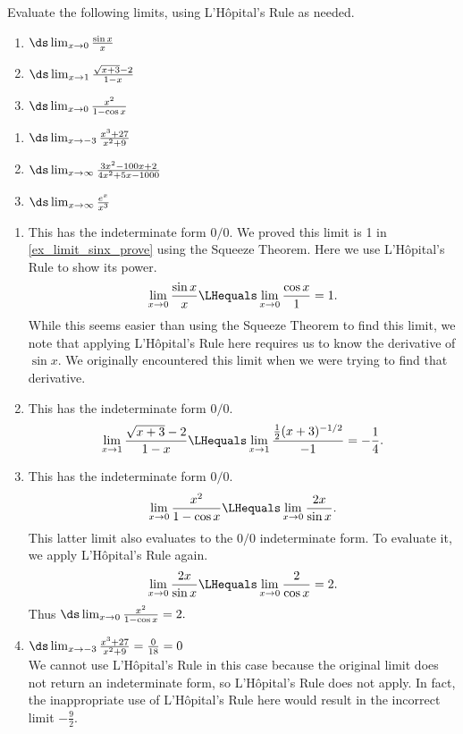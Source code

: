 \begin{example}\label{ex_lhr1}%
Evaluate the following limits, using L'Hôpital's Rule as needed.\\
\begin{minipage}[t]{.5\textwidth}
\begin{enumerate}
\item		$\ds \lim_{x\to0}\frac{\sin x}x$
\item		$\ds \lim_{x\to 1}\frac{\sqrt{x+3}-2}{1-x}$
\item		$\ds \lim_{x\to0}\frac{x^2}{1-\cos x}$
\end{enumerate}
\end{minipage}%
\begin{minipage}[t]{.5\textwidth}
\begin{enumerate}\addtocounter{enumi}{3}
	\item	$\ds\lim_{x\to-3}\frac{x^3+27}{x^2+9}$
	\item	$\ds\lim_{x\to\infty}\frac{3x^2-100x+2}{4x^2+5x-1000}$
	\item	$\ds\lim_{x\to\infty}\frac{e^x}{x^3}$
\end{enumerate}
\end{minipage}
\solution
\begin{enumerate}
	\item	This has the indeterminate form $0/0$. We proved this limit is 1 in \autoref{ex_limit_sinx_prove} using the Squeeze Theorem. Here we use L'Hôpital's Rule to show its power.
\[\lim_{x\to0}\frac{\sin x}x \LHequals \lim_{x\to0} \frac{\cos x}{1}=1.\]
While this seems easier than using the Squeeze Theorem to find this limit, we note that applying L'Hôpital's Rule here requires us to know the derivative of $\sin x$. We originally encountered this limit when we were trying to find that derivative.

	\item	This has the indeterminate form $0/0$.
\[\lim_{x\to 1}\frac{\sqrt{x+3}-2}{1-x} 	 \LHequals \lim_{x \to 1} \frac{\frac12(x+3)^{-1/2}}{-1} =-\frac 14.\]

	\item	This has the indeterminate form $0/0$.
\[\lim_{x\to 0}\frac{x^2}{1-\cos x}  \LHequals  \lim_{x\to 0} \frac{2x}{\sin x}.\]
This latter limit also evaluates to the $0/0$ indeterminate form. To evaluate it, we apply L'Hôpital's Rule again.
\[
 \lim_{x\to 0} \frac{2x}{\sin x}
 \LHequals \lim_{x\to 0} \frac{2}{\cos x} = 2 .
\]
Thus $\ds \lim_{x\to0}\frac{x^2}{1-\cos x}=2.$

	\item \hfill$\ds\lim_{x\to-3}\frac{x^3+27}{x^2+9}
	 =\frac0{18}=0$\hfill\null\smallskip\\
We cannot use L'Hôpital's Rule in this case because the original limit does not return an indeterminate form, so L'Hôpital's Rule does not apply. In fact, the inappropriate use of L'Hôpital's Rule here would result in the incorrect limit $-\frac92$.


\end{enumerate}
\end{example}

